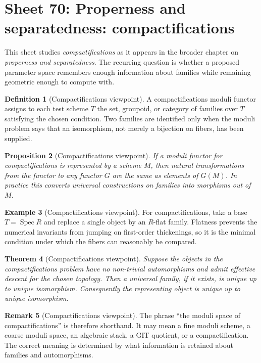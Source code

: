 \documentclass[11pt]{amsart}
\newtheorem{theorem}{Theorem}[section]
\newtheorem{proposition}[theorem]{Proposition}
\theoremstyle{definition}
\newtheorem{definition}[theorem]{Definition}
\newtheorem{example}[theorem]{Example}
\newtheorem{remark}[theorem]{Remark}
\newcommand{\Spec}{\operatorname{Spec}}
\begin{document}
\section{Sheet 70: Properness and separatedness: compactifications}
This sheet studies \emph{compactifications} as it appears in the broader chapter on \emph{properness and separatedness}.  The recurring question is whether a proposed parameter space remembers enough information about families while remaining geometric enough to compute with.
\begin{definition}[Compactifications viewpoint]
A compactifications moduli functor assigns to each test scheme $T$ the set, groupoid, or category of families over $T$ satisfying the chosen condition.  Two families are identified only when the moduli problem says that an isomorphism, not merely a bijection on fibers, has been supplied.
\end{definition}
\begin{proposition}[Compactifications viewpoint]
If a moduli functor for compactifications is represented by a scheme $M$, then natural transformations from the functor to any functor $G$ are the same as elements of $G(M)$.  In practice this converts universal constructions on families into morphisms out of $M$.
\end{proposition}
\begin{example}[Compactifications viewpoint]
For compactifications, take a base $T=\Spec R$ and replace a single object by an $R$-flat family.  Flatness prevents the numerical invariants from jumping on first-order thickenings, so it is the minimal condition under which the fibers can reasonably be compared.
\end{example}
\begin{theorem}[Compactifications viewpoint]
Suppose the objects in the compactifications problem have no non-trivial automorphisms and admit effective descent for the chosen topology.  Then a universal family, if it exists, is unique up to unique isomorphism.  Consequently the representing object is unique up to unique isomorphism.
\end{theorem}
\begin{remark}[Compactifications viewpoint]
The phrase ``the moduli space of compactifications'' is therefore shorthand.  It may mean a fine moduli scheme, a coarse moduli space, an algebraic stack, a GIT quotient, or a compactification.  The correct meaning is determined by what information is retained about families and automorphisms.
\end{remark}
\end{document}
